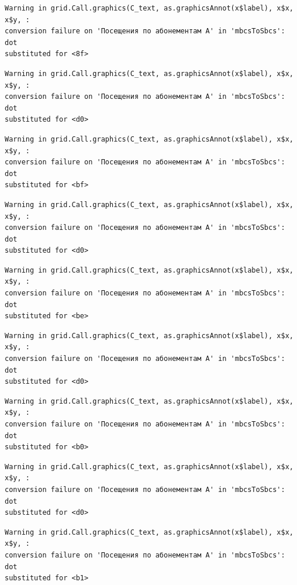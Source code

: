 \documentclass[
  letterpaper,
  DIV=11,
  numbers=noendperiod]{scrartcl}
\begin{document}
\begin{verbatim}
Warning in grid.Call.graphics(C_text, as.graphicsAnnot(x$label), x$x, x$y, :
conversion failure on 'Посещения по абонементам А' in 'mbcsToSbcs': dot
substituted for <8f>
\end{verbatim}

\begin{verbatim}
Warning in grid.Call.graphics(C_text, as.graphicsAnnot(x$label), x$x, x$y, :
conversion failure on 'Посещения по абонементам А' in 'mbcsToSbcs': dot
substituted for <d0>
\end{verbatim}

\begin{verbatim}
Warning in grid.Call.graphics(C_text, as.graphicsAnnot(x$label), x$x, x$y, :
conversion failure on 'Посещения по абонементам А' in 'mbcsToSbcs': dot
substituted for <bf>
\end{verbatim}

\begin{verbatim}
Warning in grid.Call.graphics(C_text, as.graphicsAnnot(x$label), x$x, x$y, :
conversion failure on 'Посещения по абонементам А' in 'mbcsToSbcs': dot
substituted for <d0>
\end{verbatim}

\begin{verbatim}
Warning in grid.Call.graphics(C_text, as.graphicsAnnot(x$label), x$x, x$y, :
conversion failure on 'Посещения по абонементам А' in 'mbcsToSbcs': dot
substituted for <be>
\end{verbatim}

\begin{verbatim}
Warning in grid.Call.graphics(C_text, as.graphicsAnnot(x$label), x$x, x$y, :
conversion failure on 'Посещения по абонементам А' in 'mbcsToSbcs': dot
substituted for <d0>
\end{verbatim}

\begin{verbatim}
Warning in grid.Call.graphics(C_text, as.graphicsAnnot(x$label), x$x, x$y, :
conversion failure on 'Посещения по абонементам А' in 'mbcsToSbcs': dot
substituted for <b0>
\end{verbatim}

\begin{verbatim}
Warning in grid.Call.graphics(C_text, as.graphicsAnnot(x$label), x$x, x$y, :
conversion failure on 'Посещения по абонементам А' in 'mbcsToSbcs': dot
substituted for <d0>
\end{verbatim}

\begin{verbatim}
Warning in grid.Call.graphics(C_text, as.graphicsAnnot(x$label), x$x, x$y, :
conversion failure on 'Посещения по абонементам А' in 'mbcsToSbcs': dot
substituted for <b1>
\end{verbatim}
\end{document}
